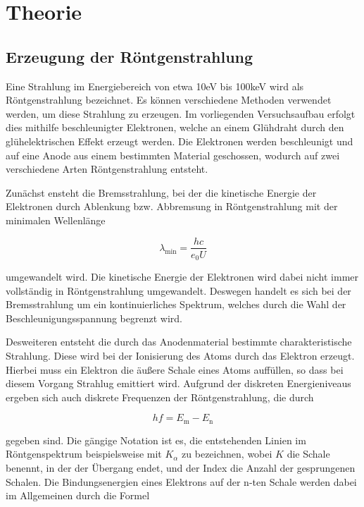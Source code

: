 \section{Theorie}
\label{sec:Theorie}

\cite{sample}

\subsection{Erzeugung der Röntgenstrahlung}

Eine Strahlung im Energiebereich von etwa 10eV bis 100keV wird als Röntgenstrahlung
bezeichnet. Es können verschiedene Methoden verwendet werden, um diese Strahlung 
zu erzeugen. 
Im vorliegenden Versuchsaufbau erfolgt dies mithilfe beschleunigter
Elektronen, welche an einem Glühdraht durch den glühelektrischen Effekt erzeugt
werden. Die Elektronen werden beschleunigt und auf eine Anode aus einem bestimmten 
Material geschossen, wodurch auf zwei verschiedene Arten Röntgenstrahlung entsteht.

Zunächst ensteht die Bremsstrahlung, bei der die kinetische Energie der Elektronen
durch Ablenkung bzw. Abbremsung in Röntgenstrahlung mit der minimalen Wellenlänge 

\begin{equation}
\lambda_\text{min} = \frac{h c}{e_0 U}
\end{equation}

umgewandelt wird. 
Die kinetische Energie der Elektronen wird dabei nicht immer vollständig in 
Röntgenstrahlung umgewandelt. Deswegen handelt es sich bei der Bremsstrahlung
um ein kontinuierliches Spektrum, welches durch die Wahl der Beschleunigungsspannung
begrenzt wird.

Desweiteren entsteht die durch das Anodenmaterial bestimmte charakteristische 
Strahlung. Diese wird bei der Ionisierung des Atoms durch das Elektron erzeugt. 
Hierbei muss ein Elektron die äußere Schale eines Atoms auffüllen, so dass bei 
diesem Vorgang Strahlug emittiert wird. 
Aufgrund der diskreten Energieniveaus ergeben sich auch diskrete Frequenzen der
Röntgenstrahlung, die durch 

\begin{equation}
h f = E_\text{m} - E_\text{n}
\end{equation}

gegeben sind. 
Die gängige Notation ist es, die entstehenden Linien im Röntgenspektrum 
beispielsweise mit $K_\alpha$ zu bezeichnen, wobei $K$ die Schale benennt,
in der der Übergang endet, und der Index die Anzahl der gesprungenen Schalen. 
Die Bindungsenergien eines Elektrons auf der n-ten Schale werden dabei im 
Allgemeinen durch die Formel 

